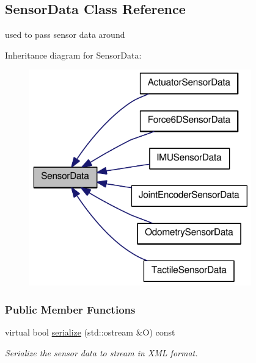\hypertarget{classOpenRAVE_1_1SensorBase_1_1SensorData}{
\subsection{SensorData Class Reference}
\label{classOpenRAVE_1_1SensorBase_1_1SensorData}
}


used to pass sensor data around  




Inheritance diagram for SensorData:\nopagebreak
\begin{figure}[H]
\begin{center}
\leavevmode
\includegraphics[width=272pt]{classOpenRAVE_1_1SensorBase_1_1SensorData__inherit__graph}
\end{center}
\end{figure}
\subsubsection*{Public Member Functions}
\begin{DoxyCompactItemize}
\item 
\hypertarget{classOpenRAVE_1_1SensorBase_1_1SensorData_a2084222cd1b9f555406d306d65680d7b}{
virtual bool \hyperlink{classOpenRAVE_1_1SensorBase_1_1SensorData_a2084222cd1b9f555406d306d65680d7b}{serialize} (std::ostream \&O) const }
\label{classOpenRAVE_1_1SensorBase_1_1SensorData_a2084222cd1b9f555406d306d65680d7b}

\begin{DoxyCompactList}\small\item\em Serialize the sensor data to stream in XML format. \item\end{DoxyCompactList}\end{DoxyCompactItemize}
